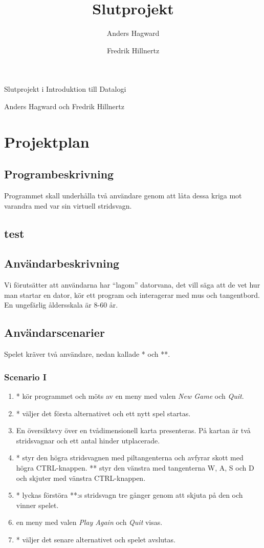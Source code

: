 \documentclass[11pt,a4paper]{article}
\author{Anders Hagward \and Fredrik Hillnertz}
\title{Slutprojekt}
\begin{document}
\thispagestyle{empty}
\begin{center}
\huge Slutprojekt i Introduktion till Datalogi

\normalsize Anders Hagward och Fredrik Hillnertz
\end{center}
\newpage

\tableofcontents
\newpage

\section{Projektplan}

\subsection{Programbeskrivning}
Programmet skall underhålla två användare genom att låta dessa kriga mot varandra med var sin virtuell stridsvagn. 

\subsection{test}

\subsection{Användarbeskrivning}
Vi förutsätter att användarna har ``lagom'' datorvana, det vill säga att de vet hur man startar en dator, kör ett program och interagerar med mus och tangentbord. En ungefärlig åldersskala är 8-60 år.

\subsection{Användarscenarier}
Spelet kräver två användare, nedan kallade * och **.

\subsubsection{Scenario I}
\begin{enumerate}
	\item * kör programmet och möts av en meny med valen \emph{New Game} och \emph{Quit}.
	\item * väljer det första alternativet och ett nytt spel startas.
	\item En översiktsvy över en tvådimensionell karta presenteras. På kartan är två stridsvagnar och ett antal hinder utplacerade.
	\item * styr den högra stridsvagnen med piltangenterna och avfyrar skott med högra CTRL-knappen. ** styr den vänstra med tangenterna W, A, S och D och skjuter med vänstra CTRL-knappen.
	\item * lyckas förstöra **:s stridsvagn tre gånger genom att skjuta på den och vinner spelet.
	\item en meny med valen \emph{Play Again} och \emph{Quit} visas.
	\item * väljer det senare alternativet och spelet avslutas.
\end{enumerate}
\end{document}
